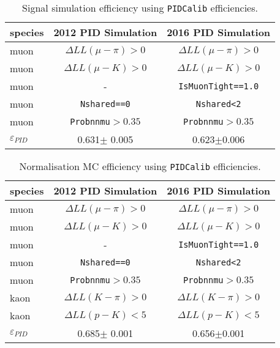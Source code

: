 \begin{table}[H]
\begin{center}
\begin{tabular}{l c c}

    species  & 2012 PID Simulation & 2016 PID Simulation\\ \hline
    muon &  $\Delta LL(\mu - \pi) > 0$ & $\Delta LL(\mu - \pi) > 0$ \\
    muon &  $\Delta LL(\mu - K) > 0$ & $\Delta LL(\mu - K) > 0$ \\
    muon &   - & \texttt{IsMuonTight==1.0}\\
    muon &  \texttt{Nshared==0} & \texttt{Nshared<2} \\
	muon &  \texttt{Probnnmu}$>0.35$ & \texttt{Probnnmu}$>0.35$ \\
     \hline
   $\varepsilon_{PID}$   & 0.631$\pm$ 0.005 & 0.623$\pm$0.006 \\

     \hline
      \end{tabular}

\end{center}
\caption{Signal simulation efficiency using \texttt{PIDCalib} efficiencies.}
\label{tab:PIDselection}
\end{table}

\begin{table}[H]
\begin{center}
\begin{tabular}{l c c}

    species  &2012 PID Simulation & 2016 PID Simulation\\ \hline
    muon &  $\Delta LL(\mu - \pi) > 0$ & $\Delta LL(\mu - \pi) > 0$ \\
    muon & $\Delta LL(\mu - K) > 0$ & $\Delta LL(\mu - K) > 0$ \\
    muon &  - & \texttt{IsMuonTight==1.0}\\
    muon & \texttt{Nshared==0} & \texttt{Nshared<2} \\
    muon & \texttt{Probnnmu}$>0.35$ & \texttt{Probnnmu}$>0.35$ \\
    kaon &  $\Delta LL(K - \pi) > 0$ & $\Delta LL(K - \pi) > 0$ \\
    kaon &  $\Delta LL(p - K) < 5$ & $\Delta LL(p - K) < 5$ \\
     \hline
    $\varepsilon_{PID}$ &0.685$\pm$ 0.001 & 0.656$\pm$0.001  \\

     \hline
      \end{tabular}

\end{center}
\caption{Normalisation MC efficiency using \texttt{PIDCalib} efficiencies.}
\label{tab:PIDselectionNorm}
\end{table}



